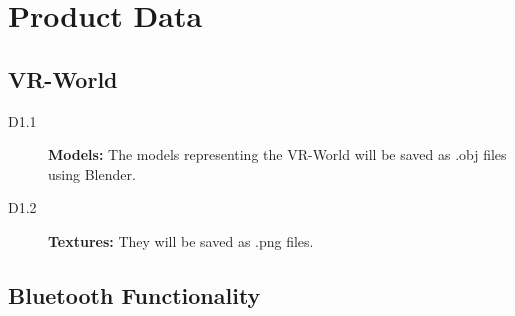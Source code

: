 \section{Product Data}

\subsection{VR-World}

\begin{description}
  \item[D1.1] \textbf{Models:} The models representing the VR-World will be saved as .obj files using Blender.
  \item[D1.2] \textbf{Textures:} They will be saved as .png files.
\end{description}

\subsection{Bluetooth Functionality}

